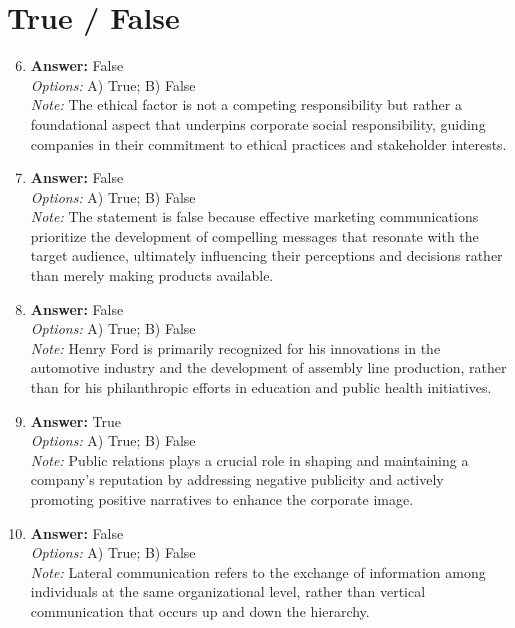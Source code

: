 \documentclass[12pt]{article}
\begin{document}
\section*{True / False}
\begin{enumerate}[label=\arabic*.]
\setcounter{enumi}{5}
\item \textbf{Answer:} False
\\ \textit{Options:} A) True; B) False
\\ \textit{Note:} The ethical factor is not a competing responsibility but rather a foundational aspect that underpins corporate social responsibility, guiding companies in their commitment to ethical practices and stakeholder interests.
\item \textbf{Answer:} False
\\ \textit{Options:} A) True; B) False
\\ \textit{Note:} The statement is false because effective marketing communications prioritize the development of compelling messages that resonate with the target audience, ultimately influencing their perceptions and decisions rather than merely making products available.
\item \textbf{Answer:} False
\\ \textit{Options:} A) True; B) False
\\ \textit{Note:} Henry Ford is primarily recognized for his innovations in the automotive industry and the development of assembly line production, rather than for his philanthropic efforts in education and public health initiatives.
\item \textbf{Answer:} True
\\ \textit{Options:} A) True; B) False
\\ \textit{Note:} Public relations plays a crucial role in shaping and maintaining a company's reputation by addressing negative publicity and actively promoting positive narratives to enhance the corporate image.
\item \textbf{Answer:} False
\\ \textit{Options:} A) True; B) False
\\ \textit{Note:} Lateral communication refers to the exchange of information among individuals at the same organizational level, rather than vertical communication that occurs up and down the hierarchy.
\end{enumerate}
\end{document}
